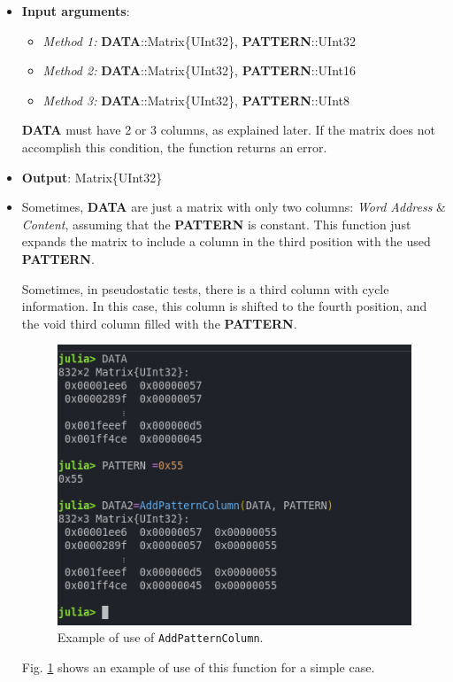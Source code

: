   \begin{itemize}
 	\item \textbf{Input arguments}: 
 	\begin{itemize}
 		\item \textit{Method 1: }\textbf{DATA}::Matrix\{UInt32\}, \textbf{PATTERN}::UInt32
 		\item \textit{Method 2: }\textbf{DATA}::Matrix\{UInt32\}, \textbf{PATTERN}::UInt16
 		\item \textit{Method 3: }\textbf{DATA}::Matrix\{UInt32\}, \textbf{PATTERN}::UInt8
 	\end{itemize}
 
 	\textbf{DATA} must have 2 or 3 columns, as explained later. If the matrix does not accomplish this condition, the function returns an error.
 
 	\item \textbf{Output}: Matrix\{UInt32\}
 	\item     Sometimes, \textbf{DATA} are just a matrix with only two columns: \textit{Word Address} \& \textit{Content}, assuming that the \textbf{PATTERN} is constant. This function just expands the matrix to include a column in the third position with the used \textbf{PATTERN}. 
 	
 	Sometimes, in pseudostatic tests, there is a third column with cycle information. In this case, this column is shifted to the fourth position, and the void third column filled with the \textbf{PATTERN}. 
 	\begin{figure}[h!]
 		\centering
 		\includegraphics[width=0.65\columnwidth]{fig/functions/AddPatternColumn.png}
 		\caption{Example of use of \texttt{AddPatternColumn}.}
 		\label{fig:Example_AddPatternColumn}
 	\end{figure}
 
 	Fig. \ref{fig:Example_AddPatternColumn} shows an example of use of this function for a simple case.
 
 \end{itemize}
 
